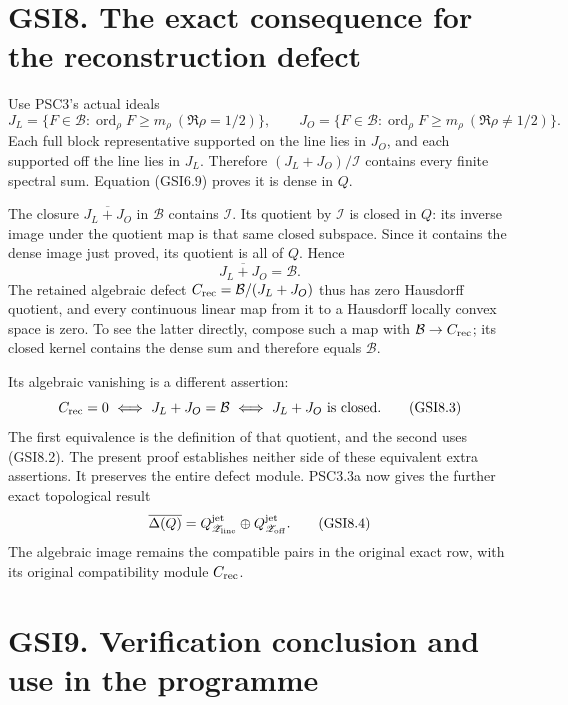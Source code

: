 \section{GSI8. The exact consequence for the reconstruction
defect}\label{gsi8.-the-exact-consequence-for-the-reconstruction-defect}

Use PSC3's actual ideals \[
J_L=\{F\in\mathcal B:\operatorname{ord}_\rho F\ge m_\rho
\ (\Re\rho=1/2)\},\qquad
J_O=\{F\in\mathcal B:\operatorname{ord}_\rho F\ge m_\rho
\ (\Re\rho\ne1/2)\}.
\tag{GSI8.1}
\] Each full block representative supported on the line lies in \(J_O\),
and each supported off the line lies in \(J_L\). Therefore
\((J_L+J_O)/\mathcal I\) contains every finite spectral sum. Equation
(GSI6.9) proves it is dense in \(Q\).

The closure \(\overline{J_L+J_O}\) in \(\mathcal B\) contains
\(\mathcal I\). Its quotient by \(\mathcal I\) is closed in \(Q\): its
inverse image under the quotient map is that same closed subspace. Since
it contains the dense image just proved, its quotient is all of \(Q\).
Hence \[
\boxed{\overline{J_L+J_O}=\mathcal B.}
\tag{GSI8.2}
\] The retained algebraic defect \(C_{\rm rec}=\mathcal B/(J_L+J_O)\)
thus has zero Hausdorff quotient, and every continuous linear map from
it to a Hausdorff locally convex space is zero. To see the latter
directly, compose such a map with \(\mathcal B\to C_{\rm rec}\); its
closed kernel contains the dense sum and therefore equals
\(\mathcal B\).

Its algebraic vanishing is a different assertion: \[
C_{\rm rec}=0
\ \Longleftrightarrow\ J_L+J_O=\mathcal B
\ \Longleftrightarrow\ J_L+J_O\text{ is closed}.
\tag{GSI8.3}
\] The first equivalence is the definition of that quotient, and the
second uses (GSI8.2). The present proof establishes neither side of
these equivalent extra assertions. It preserves the entire defect
module. PSC3.3a now gives the further exact topological result \[
\overline{\Delta(Q)}
=Q_{\mathscr Z_{\rm line}}^{\rm jet}
\oplus Q_{\mathscr Z_{\rm off}}^{\rm jet}.
\tag{GSI8.4}
\] The algebraic image remains the compatible pairs in the original
exact row, with its original compatibility module \(C_{\rm rec}\).

\section{GSI9. Verification conclusion and use in the
programme}\label{gsi9.-verification-conclusion-and-use-in-the-programme}

